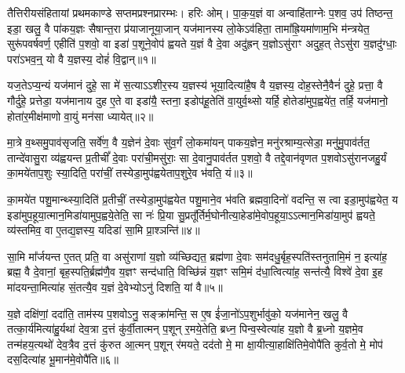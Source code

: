 {\anuvakamend[{वृ॒त्र॒हत्ये\-ऽनु॑ गाय॒त्रिणो᳚\-ऽध्व॒राणां᳚ परा॒वतो॒\-ऽस्याम॒ष्टाच॑त्वारिꣳशच्च॥12॥}]}

\setcounter{anuvakam}{0}
तैत्तिरीयसंहितायां प्रथमकाण्डे सप्तमप्रश्नप्रारम्भः। हरिः ओम्। पा॒क॒य॒ज्ञं वा अन्वाहि॑ताग्नेः प॒शव॒ उप॑ तिष्ठन्त॒ इडा॒ खलु॒ वै पा॑कय॒ज्ञः सैषान्त॒रा प्र॑याजानूया॒जान् यज॑मानस्य लो॒के\-ऽव॑हिता॒ तामा᳚ह्रि॒यमा॑णाम॒भि म॑न्त्रयेत॒ सुरू॑पवर्\mbox{}षवर्ण॒ एहीति॑ प॒शवो॒ वा इडा॑ प॒शूने॒वोप॑ ह्वयते य॒ज्ञं वै दे॒वा अदु॑ह्रन् य॒ज्ञो\-ऽसु॑राꣳ अदुह॒त् ते\-ऽसु॑रा य॒ज्ञदु॑ग्धाः॒ परा॑\-ऽभव॒न्॒ यो वै य॒ज्ञस्य॒ दोहं॑ वि॒द्वान्॥१॥

यज॒ते\-ऽप्य॒न्यं यज॑मानं दुहे॒ सा मे॑ स॒त्या\-ऽ\-ऽशीर॒स्य य॒ज्ञस्य॑ भूया॒दित्या॑है॒ष वै य॒ज्ञस्य॒ दोह॒स्तेनै॒वैनं॑ दुहे॒ प्रत्ता॒ वै गौर्दु॑हे॒ प्रत्तेडा॒ यज॑मानाय दुह ए॒ते वा इडा॑यै॒ स्तना॒ इडोप॑हू॒तेति॑ वा॒युर्व॒थ्सो यर्\mbox{}हि॒ होतेडा॑मुप॒ह्वये॑त॒ तर्\mbox{}हि॒ यज॑मानो॒ होता॑र॒मीक्ष॑माणो वा॒युं मन॑सा ध्यायेत्॥२॥

मा॒त्रे व॒थ्समु॒पाव॑सृजति॒ सर्वे॑ण॒ वै य॒ज्ञेन॑ दे॒वाः सु॑व॒र्गं लो॒कमा॑यन् पाकय॒ज्ञेन॒ मनु॑रश्राम्य॒त्सेडा॒ मनु॑मु॒पाव॑र्तत॒ तान्दे॑वासु॒रा व्य॑ह्वयन्त प्र॒तीचीं᳚ दे॒वाः परा॑ची॒मसु॑राः॒ सा दे॒वानु॒पाव॑र्तत प॒शवो॒ वै तद्दे॒वान॑वृणत प॒शवो\-ऽसु॑रानजहु॒र्यं का॒मये॑ताप॒शुः स्या॒दिति॒ परा॑चीं॒ तस्येडा॒मुप॑ह्वयेताप॒शुरे॒व भ॑वति॒ यं॥३॥

का॒मये॑त पशु॒मान्थ्स्या॒दिति॑ प्र॒तीचीं॒ तस्येडा॒मुप॑ह्वयेत पशु॒माने॒व भ॑वति ब्रह्मवा॒दिनो॑ वदन्ति॒ स त्वा इडा॒मुप॑ह्वयेत॒ य इडा॑मुप॒हूया॒त्मान॒मिडा॑यामुप॒ह्वये॒तेति॒ सा नः॑ प्रि॒या सु॒प्रतू᳚र्तिर्म॒घोनीत्या॒हेडा॑मे॒वोप॒हूया॒\-ऽ\-ऽत्मान॒मिडा॑या॒मुप॑ ह्वयते॒ व्य॑स्तमिव॒ वा ए॒तद्य॒ज्ञस्य॒ यदिडा॑ सा॒मि प्रा॒श्ञन्ति॑॥४॥

सा॒मि मा᳚र्जयन्त ए॒तत् प्रति॒ वा असु॑राणां य॒ज्ञो व्य॑च्छिद्यत॒ ब्रह्म॑णा दे॒वाः सम॑दधु॒र्बृह॒स्पति॑स्तनुतामि॒मं न॒ इत्या॑ह॒ ब्रह्म॒ वै दे॒वानां॒ बृह॒स्पति॒र्ब्रह्म॑णै॒व य॒ज्ञꣳ सन्द॑धाति॒ विच्छि॑न्नं य॒ज्ञꣳ समि॒मं द॑धा॒त्वित्या॑ह॒ सन्त॑त्यै॒ विश्वे॑ दे॒वा इ॒ह मा॑दयन्ता॒मित्या॑ह सं॒तत्यै॒व य॒ज्ञं दे॒वेभ्यो\-ऽनु॑ दिशति॒ यां वै॥५॥


य॒ज्ञे दक्षि॑णां॒ ददा॑ति॒ ताम॑स्य प॒शवो\-ऽनु॒ सङ्क्रा॑मन्ति॒ स ए॒ष ई॑जा॒नो॑\-ऽप॒शुर्भावु॑को॒ यज॑मानेन॒ खलु॒ वै तत्का॒र्य॑मित्या॑हु॒र्यथा॑ देव॒त्रा द॒त्तं कु॑र्वी॒तात्मन् प॒शून् र॒मये॒तेति॒ ब्रध्न॒ पिन्व॒स्वेत्या॑ह य॒ज्ञो वै ब्र॒ध्नो य॒ज्ञमे॒व तन्म॑हय॒त्यथो॑ देव॒त्रैव द॒त्तं कु॑रुत आ॒त्मन् प॒शून् र॑मयते॒ दद॑तो मे॒ मा क्षा॒यीत्या॒हाक्षि॑तिमे॒वोपै॑ति कुर्व॒तो मे॒ मोप॑ दस॒दित्या॑ह भू॒मान॑मे॒वोपै॑ति॥६॥


